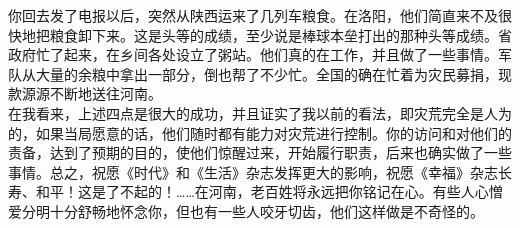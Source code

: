 你回去发了电报以后，突然从陕西运来了几列车粮食。在洛阳，他们简直来不及很快地把粮食卸下来。这是头等的成绩，至少说是棒球本垒打出的那种头等成绩。省政府忙了起来，在乡间各处设立了粥站。他们真的在工作，并且做了一些事情。军队从大量的余粮中拿出一部分，倒也帮了不少忙。全国的确在忙着为灾民募捐，现款源源不断地送往河南。\\

在我看来，上述四点是很大的成功，并且证实了我以前的看法，即灾荒完全是人为的，如果当局愿意的话，他们随时都有能力对灾荒进行控制。你的访问和对他们的责备，达到了预期的目的，使他们惊醒过来，开始履行职责，后来也确实做了一些事情。总之，祝愿《时代》和《生活》杂志发挥更大的影响，祝愿《幸福》杂志长寿、和平！这是了不起的！……在河南，老百姓将永远把你铭记在心。有些人心憎爱分明十分舒畅地怀念你，但也有一些人咬牙切齿，他们这样做是不奇怪的。\\